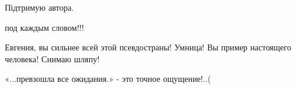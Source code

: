 \begin{itemize}
 
Підтримую автора.

 
под каждым словом!!!

 
Евгения, вы сильнее всей этой псевдостраны! Умница! Вы пример настоящего человека! Снимаю шляпу!

 
«...превзошла все ожидания.» - это точное ощущение!..(

\end{itemize}

